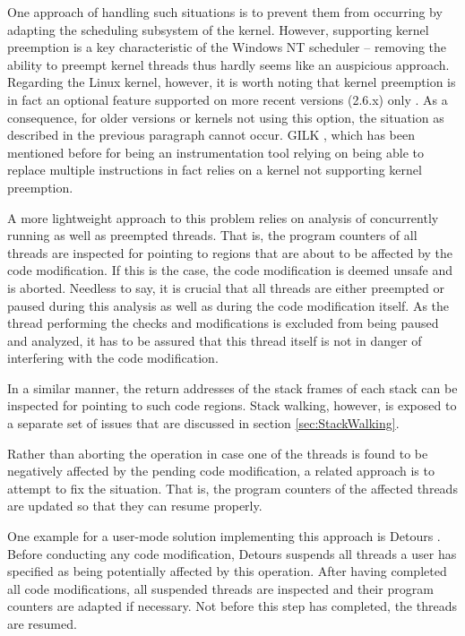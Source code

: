 One approach of handling such situations is to prevent them from occurring by adapting
the scheduling subsystem of the kernel. However, supporting kernel preemption is a key 
characteristic of the Windows NT scheduler -- removing the ability to preempt kernel 
threads thus hardly seems like an auspicious approach. Regarding the Linux kernel, 
however, it is worth noting that kernel preemption 
is in fact an optional feature supported on more recent versions (2.6.x) only \cite{linux05}. As
a consequence, for older versions or kernels not using this option, the situation as described
in the previous paragraph cannot occur. GILK \cite{Pearce00}, which has been mentioned before
for being an instrumentation tool relying on being able to replace multiple instructions in
fact relies on a kernel not supporting kernel preemption.

A more lightweight approach to this problem relies on analysis of concurrently running
as well as preempted threads. That is, the program counters of all threads are 
inspected for pointing to regions that are about to be affected by the code modification. 
If this is the case, the code modification is deemed unsafe and is aborted. Needless
to say, it is crucial that all threads are either preempted or paused during this analysis 
as well as during the code modification itself. As the thread performing the checks and
modifications is excluded from being paused and analyzed, it has to be assured that this
thread itself is not in danger of interfering with the code modification.

In a similar manner, the return addresses of the stack frames of each
stack can be inspected for pointing to such code regions. Stack walking, however, is exposed
to a separate set of issues that are discussed in section \ref{sec:StackWalking}.

Rather than aborting the operation in case one of the threads is found to be negatively affected by
the pending code modification, a related approach is to attempt to fix the situation. That is,
the program counters of the affected threads are updated so that they can resume properly.

One example for a user-mode solution implementing this approach is 
Detours \cite{Brubacher99}. Before conducting any code modification,
Detours suspends all threads a user has specified as being potentially affected
by this operation. After having completed all code modifications,
all suspended threads are inspected and their program counters are adapted if necessary.
Not before this step has completed, the threads are resumed. 

